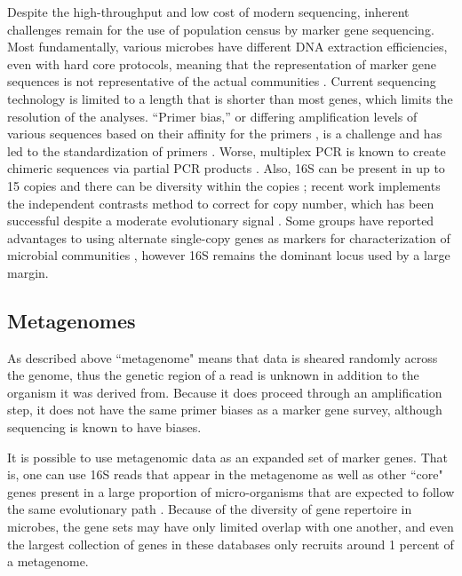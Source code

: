 \documentclass{amsart}
\begin{document}
Despite the high-throughput and low cost of modern sequencing, inherent challenges remain for the use of population census by marker gene sequencing.
Most fundamentally, various microbes have different DNA extraction efficiencies, even with hard core protocols, meaning that the representation of marker gene sequences is not representative of the actual communities \citep{morgan2010metagenomic}.
Current sequencing technology is limited to a length that is shorter than most genes, which limits the resolution of the analyses.
``Primer bias,'' or differing amplification levels of various sequences based on their affinity for the primers \citep{suzuki1996bias,polz1998bias}, is a challenge and has led to the standardization of primers \citep{methe2012framework}.
Worse, multiplex PCR is known to create chimeric sequences via partial PCR products \citep{hugenholtz2003chimeric,ashelford2005least,haas2011chimeric,schloss2011reducing}.
Also, 16S can be present in up to 15 copies and there can be diversity within the copies \citep{klappenbach2001rrndb};
recent work \citep{kembel2012incorporating} implements the independent contrasts \citep{felsenstein1985phylogenies} method to correct for copy number, which has been successful despite a moderate evolutionary signal \citep{klappenbach2000rrna}.
Some groups have reported advantages to using alternate single-copy genes as markers for characterization of microbial communities \citep[e.g.][]{case2007rpob,mcnabb2004hsp65}, however 16S remains the dominant locus used by a large margin.


\subsection{Metagenomes}

As described above ``metagenome" means that data is sheared randomly across the genome, thus the genetic region of a read is unknown in addition to the organism it was derived from.
Because it does proceed through an amplification step, it does not have the same primer biases as a marker gene survey, although sequencing is known to have biases.

It is possible to use metagenomic data as an expanded set of marker genes.
That is, one can use 16S reads that appear in the metagenome as well as other ``core" genes present in a large proportion of micro-organisms that are expected to follow the same evolutionary path \citep{von2007quantitative,wu2008amphora,stark2010mltreemap,kembel2011phylogenetic}.
Because of the diversity of gene repertoire in microbes, the gene sets may have only limited overlap with one another, and even the largest collection of genes in these databases only recruits around 1 percent of a metagenome.
\end{document}

